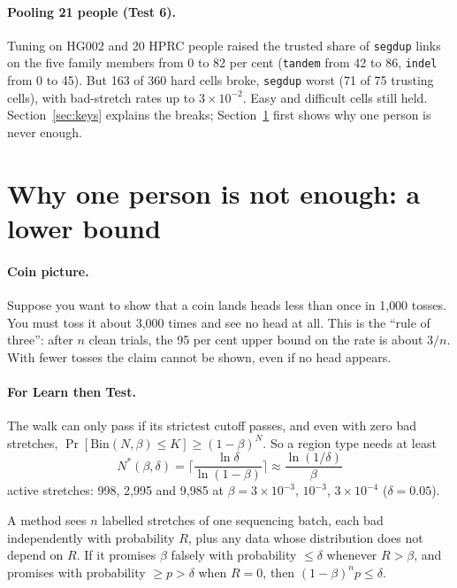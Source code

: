 \documentclass[11pt]{article}
\newcommand{\grp}[1]{\texttt{#1}}
\newcommand{\Bin}{\mathrm{Bin}}
\begin{document}
\paragraph{Pooling 21 people (Test 6).} Tuning on HG002 and 20 HPRC people
raised the trusted share of \grp{segdup} links on the five family members
from 0 to 82 per cent (\grp{tandem} from 42 to 86, \grp{indel} from 0 to
45). But 163 of 360 hard cells broke, \grp{segdup} worst (71 of 75 trusting
cells), with bad-stretch rates up to $3\times10^{-2}$. Easy and difficult
cells still held. Section~\ref{sec:keys} explains the breaks;
Section~\ref{sec:floor} first shows why one person is never enough.

\section{Why one person is not enough: a lower bound}\label{sec:floor}

\paragraph{Coin picture.} Suppose you want to show that a coin lands heads
less than once in 1{,}000 tosses. You must toss it about 3{,}000 times and
see no head at all. This is the \enquote{rule of three}: after $n$ clean trials,
the 95 per cent upper bound on the rate is about $3/n$. With fewer tosses
the claim cannot be shown, even if no head appears.

\paragraph{For Learn then Test.} The walk can only pass if its strictest
cutoff passes, and even with zero bad stretches,
$\Pr[\Bin(N,\beta)\le K]\ge(1-\beta)^N$. So a region type needs at least
\[
N^*(\beta,\delta)=\Big\lceil\frac{\ln\delta}{\ln(1-\beta)}\Big\rceil\approx
\frac{\ln(1/\delta)}{\beta}
\]
active stretches: 998, 2{,}995 and 9{,}985 at $\beta=3\times10^{-3}$, $10^{-3}$,
$3\times10^{-4}$ ($\delta=0.05$).

\begin{theorem}
A method sees $n$ labelled stretches of one sequencing batch, each bad
independently with probability $R$, plus any data whose distribution does not
depend on $R$. If it promises $\beta$ falsely with probability $\le\delta$
whenever $R>\beta$, and promises with probability $\ge p>\delta$ when $R=0$,
then $(1-\beta)^n p\le\delta$.
\end{theorem}
\end{document}
